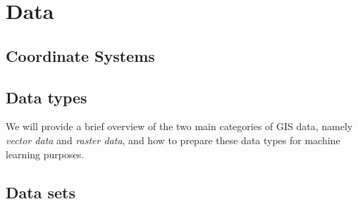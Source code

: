 \section{Data}%
\label{sec:data}



\subsection{Coordinate Systems}%
\label{sec:coordinate-systems}


\subsection{Data types}%
\label{sec:data-types}

We will provide a brief overview of the two main categories of GIS data, namely \textit{vector data} and \textit{raster data}, and how to prepare these data types for machine learning purposes.



%
\label{sec:raster-data}


\subsection{Data sets}%
\label{sec:data-sets}






